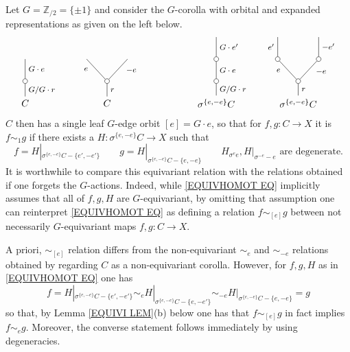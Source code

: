 \documentclass[a4paper,10pt
,draft
]{article}%
\renewcommand{\1}{\ensuremath{\mathbb{id}}}
\begin{document}
\begin{example}\label{EQUIVSIM EX}
	Let $G = \mathbb{Z}_{/2} = \{\pm 1\}$
	and consider the $G$-corolla with orbital and expanded representations as given on the left below.
\[
\begin{tikzpicture}
[grow=up,auto,level distance=2.3em,every node/.style = {font=\footnotesize},dummy/.style={circle,draw,inner sep=0pt,minimum size=1.75mm}]
	\node at (0,0) [font=\normalsize]{$C$}
		child{node [dummy] {}
			child{
			edge from parent node [swap] {$G \cdot e$}
node [name=Kone,swap] {}}
		edge from parent node [swap] {$G/G \cdot r$}
		};
	\node at (3,0) [font=\normalsize]{$C$}
		child{node [dummy] {}
			child{
			edge from parent node [swap,near end] {$-e$} node [name=Kn] {}}
			child{
			edge from parent node [near end] {$e$}
node [name=Kone,swap] {}}
		edge from parent node [swap] {$r$}
		};
	\node at (7,0) [font=\normalsize]{$\sigma^{\{e,-e\}} C$}
		child{node [dummy] {}
			child{node [dummy] {}
				child{
				edge from parent node [swap] {$G \cdot e'$}
node [swap] {}}
			edge from parent node [swap] {$G \cdot e$}
node [swap] {}}
		edge from parent node [swap] {$G/G \cdot r$}
		};
	\node at (10,0) [font=\normalsize]{$\sigma^{\{e,-e\}} C$}
		child{node [dummy] {}
			child{node [dummy] {}
				child{
				edge from parent node [swap] {$-e'$} node {}}
			edge from parent node [swap,near end] {$-e$} node {}}
			child{node [dummy] {}
				child{
				edge from parent node {$e'$}
node [swap] {}}
			edge from parent node [near end] {$e$}
node [swap] {}}
		edge from parent node [swap] {$r$}
		};
\end{tikzpicture}
\]
$C$ then has a single leaf $G$-edge orbit $[e] = G \cdot e$, so that for
$f,g \colon C \to X$ it is
$f \sim_1 g$
if there exists a 
$H \colon \sigma^{\{e,-e\}}C \to X$
such that 
\begin{equation}\label{EQUIVHOMOT EQ}
	f = H|_{\sigma^{\{e,-e\}}C - \{e',-e'\}}
\qquad
	g = H|_{\sigma^{\{e,-e\}}C - \{e,-e\}}
\qquad
	H_{\sigma^e e}, H|_{\sigma^{-e}-e} \text{ are degenerate}.
\end{equation}
It is worthwhile to compare this equivariant relation with the relations obtained if one forgets the $G$-actions. Indeed, while \eqref{EQUIVHOMOT EQ} implicitly assumes that all of $f,g,H$ are $G$-equivariant,
by omitting that assumption one can reinterpret 
\eqref{EQUIVHOMOT EQ}
as defining a relation
$f \sim_{[e]} g$ between not necessarily $G$-equivariant maps $f,g \colon C \to X$.

A priori, $\sim_{[e]}$ relation differs from the 
non-equivariant 
$\sim_{e}$ and $\sim_{-e}$
relations obtained by regarding $C$ as a non-equivariant corolla.
However, for $f,g,H$ as in \eqref{EQUIVHOMOT EQ} one has
\begin{equation}\label{EQUIVSIM EQ}
f = H|_{\sigma^{\{e,-e\}}C - \{e',-e'\}}
\sim_e H|_{\sigma^{\{e,-e\}}C - \{e,-e'\}}
\sim_{-e} H|_{\sigma^{\{e,-e\}}C - \{e,-e\}} =g
\end{equation}
so that, by Lemma \ref{EQUIVI LEM}(b) below one has that
$f \sim_{[e]} g$ in fact implies
$f \sim_{e} g$. Moreover, the converse statement follows immediately by using degeneracies.


\end{example}
\end{document}

